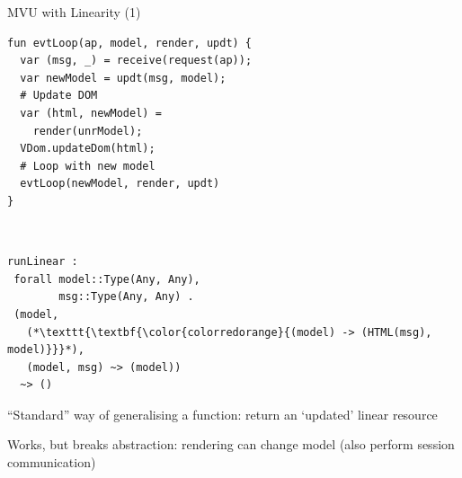 \documentclass[11.5pt, aspectratio=169]{beamer}
\begin{document}
\begin{frame}[fragile]{MVU with Linearity (1)}

\begin{minipage}{0.55\textwidth}
  \begin{lstlisting}[language=links]
fun evtLoop(ap, model, render, updt) {
  var (msg, _) = receive(request(ap));
  var newModel = updt(msg, model);
  # Update DOM
  var (html, newModel) =
    render(unrModel);
  VDom.updateDom(html);
  # Loop with new model
  evtLoop(newModel, render, updt)
}
  \end{lstlisting}
\end{minipage}
~
\begin{minipage}{0.42\textwidth}
  \begin{lstlisting}[numbers=none, backgroundcolor=\color{white}]
runLinear :
 forall model::Type(Any, Any),
        msg::Type(Any, Any) .
 (model,
   (*\texttt{\textbf{\color{colorredorange}{(model) -> (HTML(msg), model)}}}*),
   (model, msg) ~> (model))
  ~> ()
\end{lstlisting}
\end{minipage}

  \begin{fullpageitemize}
  \item ``Standard'' way of generalising a function: return an `updated' linear resource
  \item Works, but breaks abstraction: rendering can change model (also perform session communication)
  \end{fullpageitemize}
\end{frame}
\end{document}
